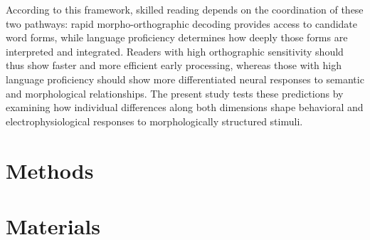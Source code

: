 \documentclass[preprint,12pt, authoryear, review]{elsarticle}
\begin{document}
According to this framework, skilled reading depends on the coordination of these two pathways: rapid morpho-orthographic decoding provides access to candidate word forms, while language proficiency determines how deeply those forms are interpreted and integrated. Readers with high orthographic sensitivity should thus show faster and more efficient early processing, whereas those with high language proficiency should show more differentiated neural responses to semantic and morphological relationships. The present study tests these predictions by examining how individual differences along both dimensions shape behavioral and electrophysiological responses to morphologically structured stimuli.




\section{Methods}

\section{Materials}
\end{document}
